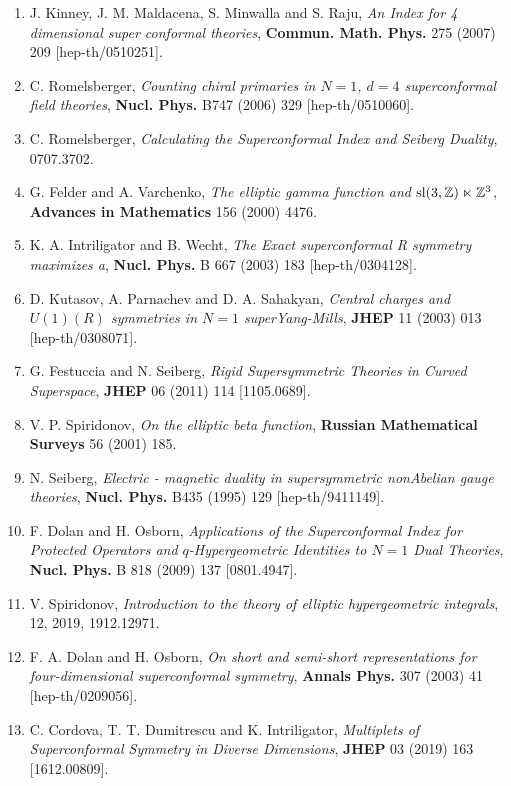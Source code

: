 \begin{enumerate}
\item[{[12]}] J. Kinney, J. M. Maldacena, S. Minwalla and S. Raju, \textit{An Index for 4 dimensional super conformal theories}, \textbf{Commun. Math. Phys.} 275 (2007) 209 [hep-th/0510251].
\item[{[13]}] C. Romelsberger, \textit{Counting chiral primaries in $N=1$, $d=4$ superconformal field theories}, \textbf{Nucl. Phys.} B747 (2006) 329 [hep-th/0510060].
\item[{[14]}] C. Romelsberger, \textit{Calculating the Superconformal Index and Seiberg Duality}, 0707.3702.
\item[{[15]}] G. Felder and A. Varchenko, \textit{The elliptic gamma function and $\mathrm{sl}(3,\mathbb{Z})\ltimes\mathbb{Z}^3$}, \textbf{Advances in Mathematics} 156 (2000) 4476.
\item[{[16]}] K. A. Intriligator and B. Wecht, \textit{The Exact superconformal R symmetry maximizes a}, \textbf{Nucl. Phys.} B 667 (2003) 183 [hep-th/0304128].
\item[{[17]}] D. Kutasov, A. Parnachev and D. A. Sahakyan, \textit{Central charges and $U(1)(R)$ symmetries in $N=1$ superYang-Mills}, \textbf{JHEP} 11 (2003) 013 [hep-th/0308071].
\item[{[18]}] G. Festuccia and N. Seiberg, \textit{Rigid Supersymmetric Theories in Curved Superspace}, \textbf{JHEP} 06 (2011) 114 [1105.0689].
\item[{[19]}] V. P. Spiridonov, \textit{On the elliptic beta function}, \textbf{Russian Mathematical Surveys} 56 (2001) 185.
\item[{[20]}] N. Seiberg, \textit{Electric - magnetic duality in supersymmetric nonAbelian gauge theories}, \textbf{Nucl. Phys.} B435 (1995) 129 [hep-th/9411149].
\item[{[21]}] F. Dolan and H. Osborn, \textit{Applications of the Superconformal Index for Protected Operators and $q$-Hypergeometric Identities to $N=1$ Dual Theories}, \textbf{Nucl. Phys.} B 818 (2009) 137 [0801.4947].
\item[{[22]}] V. Spiridonov, \textit{Introduction to the theory of elliptic hypergeometric integrals}, 12, 2019, 1912.12971.
\item[{[23]}] F. A. Dolan and H. Osborn, \textit{On short and semi-short representations for four-dimensional superconformal symmetry}, \textbf{Annals Phys.} 307 (2003) 41 [hep-th/0209056].
\item[{[24]}] C. Cordova, T. T. Dumitrescu and K. Intriligator, \textit{Multiplets of Superconformal Symmetry in Diverse Dimensions}, \textbf{JHEP} 03 (2019) 163 [1612.00809].

\end{enumerate}
